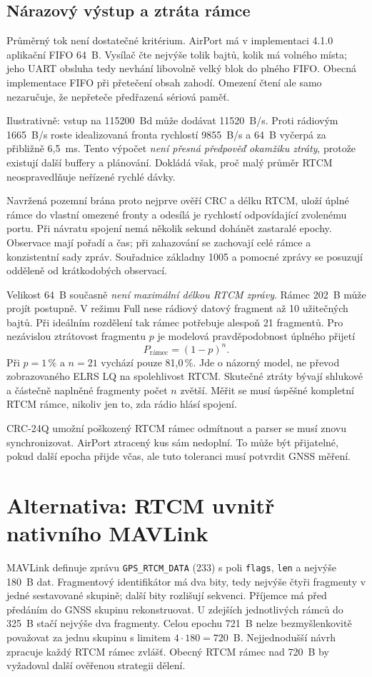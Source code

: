 \documentclass[11pt,a4paper]{article}
\begin{document}
\subsection{Nárazový výstup a ztráta rámce}
Průměrný tok není dostatečné kritérium. AirPort má v implementaci 4.1.0 aplikační FIFO 64~B.\cite{telemetry} Vysílač čte nejvýše tolik bajtů, kolik má volného místa; jeho UART obsluha tedy nevhání libovolně velký blok do plného FIFO. Obecná implementace FIFO při přetečení obsah zahodí. Omezení čtení ale samo nezaručuje, že nepřeteče předřazená sériová paměť.\cite{txcode,fifo}

Ilustrativně: vstup na 115200~Bd může dodávat 11520~B/s. Proti rádiovým 1665~B/s roste idealizovaná fronta rychlostí 9855~B/s a 64~B vyčerpá za přibližně 6,5~ms. Tento výpočet \emph{není přesná předpověď okamžiku ztráty}, protože existují další buffery a plánování. Dokládá však, proč malý průměr RTCM neospravedlňuje neřízené rychlé dávky.

Navržená pozemní brána proto nejprve ověří CRC a délku RTCM, uloží úplné rámce do vlastní omezené fronty a odesílá je rychlostí odpovídající zvolenému portu. Při návratu spojení nemá několik sekund dohánět zastaralé epochy. Observace mají pořadí a čas; při zahazování se zachovají celé rámce a konzistentní sady zpráv. Souřadnice základny 1005 a pomocné zprávy se posuzují odděleně od krátkodobých observací.

Velikost 64~B současně \emph{není maximální délkou RTCM zprávy}. Rámec 202~B může projít postupně. V režimu Full nese rádiový datový fragment až 10 užitečných bajtů.\cite{telemetry,ota} Při ideálním rozdělení tak rámec potřebuje alespoň 21 fragmentů. Pro nezávislou ztrátovost fragmentu $p$ je modelová pravděpodobnost úplného přijetí
\begin{equation}
 P_{\text{rámec}}=(1-p)^n.
\end{equation}
Při $p=1\,\%$ a $n=21$ vychází pouze 81,0\,\%. Jde o názorný model, ne převod zobrazovaného ELRS LQ na spolehlivost RTCM. Skutečné ztráty bývají shlukové a částečně naplněné fragmenty počet $n$ zvětší. Měřit se musí úspěšné kompletní RTCM rámce, nikoliv jen to, zda rádio hlásí spojení.

CRC-24Q umožní poškozený RTCM rámec odmítnout a parser se musí znovu synchronizovat. AirPort ztracený kus sám nedoplní. To může být přijatelné, pokud další epocha přijde včas, ale tuto toleranci musí potvrdit GNSS měření.

\section{Alternativa: RTCM uvnitř nativního MAVLink}
MAVLink definuje zprávu \texttt{GPS\_RTCM\_DATA} (233) s poli \texttt{flags}, \texttt{len} a nejvýše 180~B dat. Fragmentový identifikátor má dva bity, tedy nejvýše čtyři fragmenty v jedné sestavované skupině; další bity rozlišují sekvenci. Příjemce má před předáním do GNSS skupinu rekonstruovat.\cite{mavmessage} U zdejších jednotlivých rámců do 325~B stačí nejvýše dva fragmenty. Celou epochu 721~B nelze bezmyšlenkovitě považovat za jednu skupinu s limitem $4\cdot180=720$~B. Nejjednodušší návrh zpracuje každý RTCM rámec zvlášť. Obecný RTCM rámec nad 720~B by vyžadoval další ověřenou strategii dělení.
\end{document}
